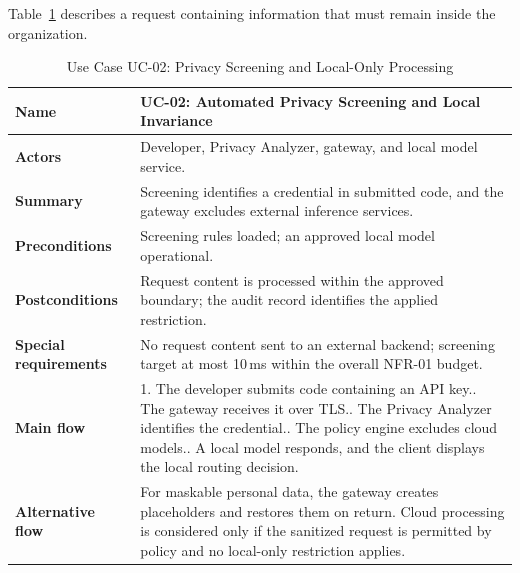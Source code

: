 Table~\ref{tab:uc02} describes a request containing information that must remain inside the organization.
\begin{table}[H]
\centering\small
\caption{Use Case UC-02: Privacy Screening and Local-Only Processing}
\label{tab:uc02}
\renewcommand{\arraystretch}{1.08}
\begin{tabularx}{\textwidth}{|p{3.1cm}|X|}
\hline
\textbf{Name} & UC-02: Automated Privacy Screening and Local Invariance \\ \hline
\textbf{Actors} & Developer, Privacy Analyzer, gateway, and local model service. \\ \hline
\textbf{Summary} & Screening identifies a credential in submitted code, and the gateway excludes external inference services. \\ \hline
\textbf{Preconditions} & Screening rules loaded; an approved local model operational. \\ \hline
\textbf{Postconditions} & Request content is processed within the approved boundary; the audit record identifies the applied restriction. \\ \hline
\textbf{Special requirements} & No request content sent to an external backend; screening target at most 10\,ms within the overall NFR-01 budget. \\ \hline
\textbf{Main flow} & 1. The developer submits code containing an API key.\newline 2. The gateway receives it over TLS.\newline 3. The Privacy Analyzer identifies the credential.\newline 4. The policy engine excludes cloud models.\newline 5. A local model responds, and the client displays the local routing decision. \\ \hline
\textbf{Alternative flow} & For maskable personal data, the gateway creates placeholders and restores them on return. Cloud processing is considered only if the sanitized request is permitted by policy and no local-only restriction applies. \\ \hline
\end{tabularx}
\end{table}

